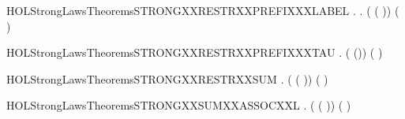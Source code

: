 \begin{SaveVerbatim}{HOLStrongLawsTheoremsSTRONGXXRESTRXXPREFIXXXLABEL}
\HOLTokenTurnstile{} \HOLSymConst{\HOLTokenForall{}} .
        \HOLConst{\HOLTokenNotIn{}}  \HOLSymConst{\HOLTokenConj{}}   \HOLConst{\HOLTokenNotIn{}}  \HOLSymConst{\HOLTokenImp{}}
       \HOLSymConst{\HOLTokenForall{}}.  (\HOLConst{\ensuremath{\nu}}  ( )) ( \HOLConst{\ensuremath{\nu}}  )
\end{SaveVerbatim}
\newcommand{\HOLStrongLawsTheoremsSTRONGXXRESTRXXPREFIXXXLABEL}{\UseVerbatim{HOLStrongLawsTheoremsSTRONGXXRESTRXXPREFIXXXLABEL}}
\begin{SaveVerbatim}{HOLStrongLawsTheoremsSTRONGXXRESTRXXPREFIXXXTAU}
\HOLTokenTurnstile{} \HOLSymConst{\HOLTokenForall{}} .  (\HOLConst{\ensuremath{\nu}}  (\HOLConst{\ensuremath{\tau}})) (\HOLConst{\ensuremath{\tau}}\HOLConst{\ensuremath{\nu}}  )
\end{SaveVerbatim}
\newcommand{\HOLStrongLawsTheoremsSTRONGXXRESTRXXPREFIXXXTAU}{\UseVerbatim{HOLStrongLawsTheoremsSTRONGXXRESTRXXPREFIXXXTAU}}
\begin{SaveVerbatim}{HOLStrongLawsTheoremsSTRONGXXRESTRXXSUM}
\HOLTokenTurnstile{} \HOLSymConst{\HOLTokenForall{}}  .  (\HOLConst{\ensuremath{\nu}}  ( \HOLSymConst{\ensuremath{+}} )) (\HOLConst{\ensuremath{\nu}}   \HOLSymConst{\ensuremath{+}} \HOLConst{\ensuremath{\nu}}  )
\end{SaveVerbatim}
\newcommand{\HOLStrongLawsTheoremsSTRONGXXRESTRXXSUM}{\UseVerbatim{HOLStrongLawsTheoremsSTRONGXXRESTRXXSUM}}
\begin{SaveVerbatim}{HOLStrongLawsTheoremsSTRONGXXSUMXXASSOCXXL}
\HOLTokenTurnstile{} \HOLSymConst{\HOLTokenForall{}}  .  ( \HOLSymConst{\ensuremath{+}} ( \HOLSymConst{\ensuremath{+}} )) ( \HOLSymConst{\ensuremath{+}}  \HOLSymConst{\ensuremath{+}} )
\end{SaveVerbatim}
